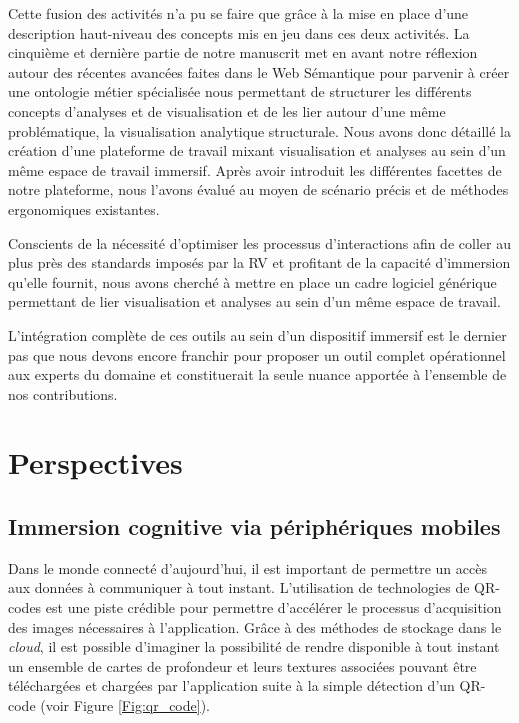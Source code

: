 Cette fusion des activités n'a pu se faire que grâce à la mise en place d'une description haut-niveau des concepts mis en jeu dans ces deux activités. La cinquième et dernière partie de notre manuscrit met en avant notre réflexion autour des récentes avancées faites dans le Web Sémantique pour parvenir à créer une ontologie métier spécialisée nous permettant de structurer les différents concepts d'analyses et de visualisation et de les lier autour d'une même problématique, la visualisation analytique structurale.
Nous avons donc détaillé la création d'une plateforme de travail mixant visualisation et analyses au sein d'un même espace de travail immersif. Après avoir introduit les différentes facettes de notre plateforme, nous l'avons évalué au moyen de scénario précis et de méthodes ergonomiques existantes.

Conscients de la nécessité d'optimiser les processus d'interactions afin de coller au plus près des standards imposés par la RV et profitant de la capacité d'immersion qu'elle fournit, nous avons cherché à mettre en place un cadre logiciel générique permettant de lier visualisation et analyses au sein d'un même espace de travail.




L'intégration complète de ces outils au sein d'un dispositif immersif est le dernier pas que nous devons encore franchir pour proposer un outil complet opérationnel aux experts du domaine et constituerait la seule nuance apportée à l'ensemble de nos contributions.




\section*{Perspectives}

\subsection{Immersion cognitive via périphériques mobiles}

Dans le monde connecté d'aujourd'hui, il est important de permettre un accès aux données à communiquer à tout instant. L'utilisation de technologies de QR-codes est une piste crédible pour permettre d'accélérer le processus d'acquisition des images nécessaires à l'application. Grâce à des méthodes de stockage dans le \textit{cloud}, il est possible d'imaginer la possibilité de rendre disponible à tout instant un ensemble de cartes de profondeur et leurs textures associées pouvant être téléchargées et chargées par l'application suite à la simple détection d'un QR-code (voir Figure \ref{Fig:qr_code}).

